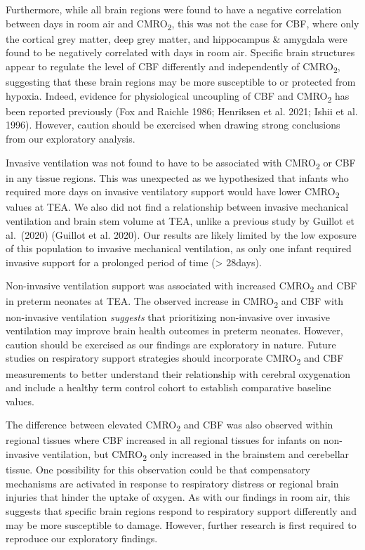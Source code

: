 \documentclass[
  letterpaper,
  DIV=11,
  numbers=noendperiod]{scrartcl}
\begin{document}
Furthermore, while all brain regions were found to have a negative
correlation between days in room air and CMRO\textsubscript{2}, this was
not the case for CBF, where only the cortical grey matter, deep grey
matter, and hippocampus \& amygdala were found to be negatively
correlated with days in room air. Specific brain structures appear to
regulate the level of CBF differently and independently of
CMRO\textsubscript{2}, suggesting that these brain regions may be more
susceptible to or protected from hypoxia. Indeed, evidence for
physiological uncoupling of CBF and CMRO\textsubscript{2} has been
reported previously (Fox and Raichle 1986; Henriksen et al. 2021; Ishii
et al. 1996). However, caution should be exercised when drawing strong
conclusions from our exploratory analysis.

Invasive ventilation was not found to have to be associated with
CMRO\textsubscript{2} or CBF in any tissue regions. This was unexpected
as we hypothesized that infants who required more days on invasive
ventilatory support would have lower CMRO\textsubscript{2} values at
TEA. We also did not find a relationship between invasive mechanical
ventilation and brain stem volume at TEA, unlike a previous study by
Guillot et al.~(2020) (Guillot et al. 2020). Our results are likely
limited by the low exposure of this population to invasive mechanical
ventilation, as only one infant required invasive support for a
prolonged period of time (\textgreater{} 28days).

Non-invasive ventilation support was associated with increased
CMRO\textsubscript{2} and CBF in preterm neonates at TEA. The observed
increase in CMRO\textsubscript{2} and CBF with non-invasive ventilation
\emph{suggests} that prioritizing non-invasive over invasive ventilation
may improve brain health outcomes in preterm neonates. However, caution
should be exercised as our findings are exploratory in nature. Future
studies on respiratory support strategies should incorporate
CMRO\textsubscript{2} and CBF measurements to better understand their
relationship with cerebral oxygenation and include a healthy term
control cohort to establish comparative baseline values.

The difference between elevated CMRO\textsubscript{2} and CBF was also
observed within regional tissues where CBF increased in all regional
tissues for infants on non-invasive ventilation, but
CMRO\textsubscript{2} only increased in the brainstem and cerebellar
tissue. One possibility for this observation could be that compensatory
mechanisms are activated in response to respiratory distress or regional
brain injuries that hinder the uptake of oxygen. As with our findings in
room air, this suggests that specific brain regions respond to
respiratory support differently and may be more susceptible to damage.
However, further research is first required to reproduce our exploratory
findings.
\end{document}
